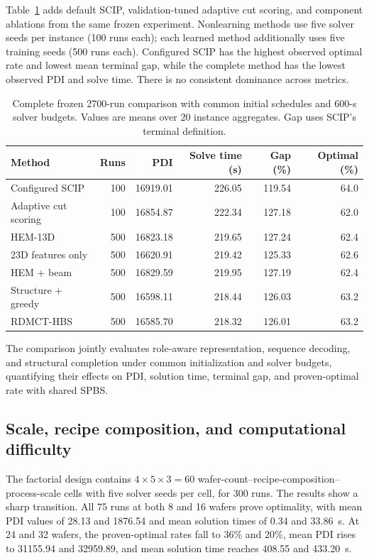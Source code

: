 \documentclass[journal]{IEEEtran}
\newcommand{\method}{RDMCT-HBS}
\begin{document}
Table~\ref{tab:all-methods} adds default SCIP, validation-tuned adaptive cut scoring, and component ablations from the same frozen experiment. Nonlearning methods use five solver seeds per instance (100 runs each); each learned method additionally uses five training seeds (500 runs each). Configured SCIP has the highest observed optimal rate and lowest mean terminal gap, while the complete method has the lowest observed PDI and solve time. There is no consistent dominance across metrics.

\begin{table}[t]
\centering\footnotesize
\caption{Complete frozen 2700-run comparison with common initial schedules and 600-s solver budgets. Values are means over 20 instance aggregates. Gap uses SCIP's terminal definition.}
\label{tab:all-methods}
\begin{tabular}{lrrrrr}\toprule
Method & Runs & PDI & Solve time (s) & Gap (\%) & Optimal (\%)\\\midrule
Configured SCIP & 100 & 16919.01 & 226.05 & 119.54 & 64.0 \\
Adaptive cut scoring & 100 & 16854.87 & 222.34 & 127.18 & 62.0 \\
HEM-13D & 500 & 16823.18 & 219.65 & 127.24 & 62.4 \\
23D features only & 500 & 16620.91 & 219.42 & 125.33 & 62.6 \\
HEM + beam & 500 & 16829.59 & 219.95 & 127.19 & 62.4 \\
Structure + greedy & 500 & 16598.11 & 218.44 & 126.03 & 63.2 \\
\method{} & 500 & 16585.70 & 218.32 & 126.01 & 63.2 \\
\bottomrule\end{tabular}\end{table}

The comparison jointly evaluates role-aware representation, sequence decoding, and structural completion under common initialization and solver budgets, quantifying their effects on PDI, solution time, terminal gap, and proven-optimal rate with shared SPBS.

\subsection{Scale, recipe composition, and computational difficulty}

The factorial design contains $4\times5\times3=60$ wafer-count--recipe-composition--process-scale cells with five solver seeds per cell, for 300 runs. The results show a sharp transition. All 75 runs at both 8 and 16 wafers prove optimality, with mean PDI values of 28.13 and 1876.54 and mean solution times of 0.34 and 33.86~s. At 24 and 32 wafers, the proven-optimal rates fall to 36\% and 20\%, mean PDI rises to 31155.94 and 32959.89, and mean solution time reaches 408.55 and 433.20~s.
\end{document}
